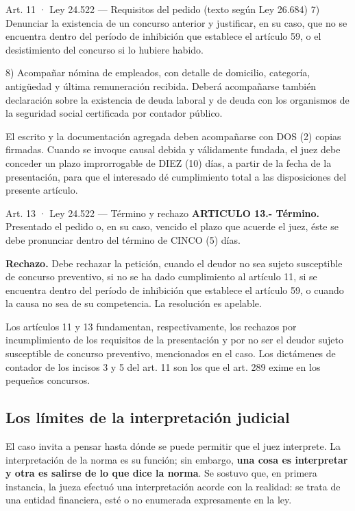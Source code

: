 \documentclass[12pt,oneside]{book}
\begin{document}
\begin{norma}{Art. 11 · Ley 24.522 — Requisitos del pedido (texto según Ley 26.684)}
7) Denunciar la existencia de un concurso anterior y justificar, en su caso, que no se encuentra dentro del período de inhibición que establece el artículo 59, o el desistimiento del concurso si lo hubiere habido.

8) Acompañar nómina de empleados, con detalle de domicilio, categoría, antigüedad y última remuneración recibida. Deberá acompañarse también declaración sobre la existencia de deuda laboral y de deuda con los organismos de la seguridad social certificada por contador público.

El escrito y la documentación agregada deben acompañarse con DOS (2) copias firmadas. Cuando se invoque causal debida y válidamente fundada, el juez debe conceder un plazo improrrogable de DIEZ (10) días, a partir de la fecha de la presentación, para que el interesado dé cumplimiento total a las disposiciones del presente artículo.
\end{norma}

\begin{norma}{Art. 13 · Ley 24.522 — Término y rechazo}
\textbf{ARTICULO 13.- Término.} Presentado el pedido o, en su caso, vencido el plazo que acuerde el juez, éste se debe pronunciar dentro del término de CINCO (5) días.

\textbf{Rechazo.} Debe rechazar la petición, cuando el deudor no sea sujeto susceptible de concurso preventivo, si no se ha dado cumplimiento al artículo 11, si se encuentra dentro del período de inhibición que establece el artículo 59, o cuando la causa no sea de su competencia. La resolución es apelable.
\end{norma}

\begin{note}
Los artículos 11 y 13 fundamentan, respectivamente, los rechazos por incumplimiento de los requisitos de la presentación y por no ser el deudor sujeto susceptible de concurso preventivo, mencionados en el caso. Los dictámenes de contador de los incisos 3 y 5 del art. 11 son los que el art. 289 exime en los pequeños concursos.
\end{note}

\subsection{Los límites de la interpretación judicial}

El caso invita a pensar hasta dónde se puede permitir que el juez interprete. La interpretación de la norma es su función; sin embargo, \textbf{una cosa es interpretar y otra es salirse de lo que dice la norma}. Se sostuvo que, en primera instancia, la jueza efectuó una interpretación acorde con la realidad: se trata de una entidad financiera, esté o no enumerada expresamente en la ley.
\end{document}
